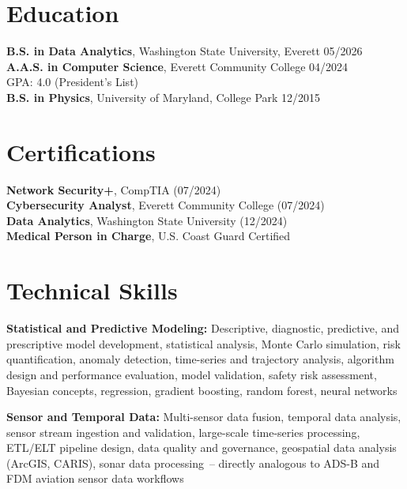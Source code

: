 \documentclass[10pt,letterpaper]{moderncv}
\begin{document}
\vspace*{2mm}
\section{Education}
\vspace*{1mm}
\textbf{B.S. in Data Analytics}, Washington State University, Everett \hfill 05/2026\\
\textbf{A.A.S. in Computer Science}, Everett Community College \hfill 04/2024\\
GPA: 4.0 (President's List)\\
\textbf{B.S. in Physics}, University of Maryland, College Park \hfill 12/2015

\vspace*{2mm}
\section{Certifications}
\vspace*{1mm}
\textbf{Network Security+}, CompTIA (07/2024)\\
\textbf{Cybersecurity Analyst}, Everett Community College (07/2024)\\
\textbf{Data Analytics}, Washington State University (12/2024)\\
\textbf{Medical Person in Charge}, U.S. Coast Guard Certified

\vspace*{2mm}
\section{Technical Skills}
\vspace*{1mm}
\textbf{Statistical and Predictive Modeling:} Descriptive, diagnostic, predictive, and prescriptive model development, statistical analysis, Monte Carlo simulation, risk quantification, anomaly detection, time-series and trajectory analysis, algorithm design and performance evaluation, model validation, safety risk assessment, Bayesian concepts, regression, gradient boosting, random forest, neural networks

\textbf{Sensor and Temporal Data:} Multi-sensor data fusion, temporal data analysis, sensor stream ingestion and validation, large-scale time-series processing, ETL/ELT pipeline design, data quality and governance, geospatial data analysis (ArcGIS, CARIS), sonar data processing~-- directly analogous to ADS-B and FDM aviation sensor data workflows
\end{document}
